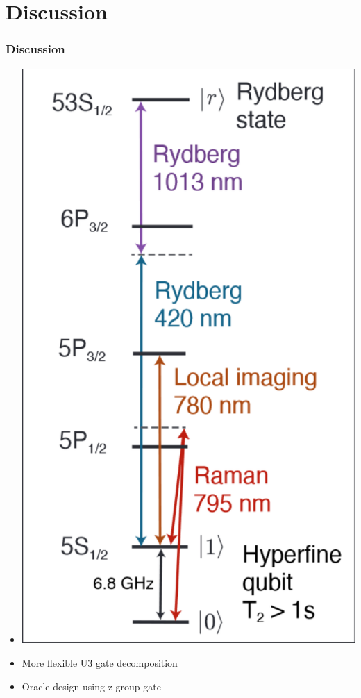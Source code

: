 \documentclass[18 pt]{beamer}
\begin{document}
\section{Discussion}
\begin{frame}
    \frametitle{}
\end{frame}
\begin{frame}
    \frametitle{Discussion}
    \begin{itemize}
        \item \includegraphics[width=\textwidth]{level.png}
        \item More flexible U3 gate decomposition
        \item Oracle design using z group gate
    \end{itemize}
\end{frame}
\end{document}
